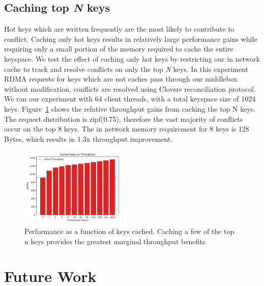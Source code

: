 \subsection{Caching top \textit{N} keys} 
Hot keys which are written frequently are the most likely to
contribute to conflict. Caching only hot keys results in relatively
large performance gains while requiring only a small portion of the
memory required to cache the entire keyspace. We test the effect of
caching only hot keys by restricting our in network cache to track and
resolve conflicts on only the top \textit{N} keys. In this experiment
RDMA requests for keys which are not caches pass through our middlebox
without modification, conflicts are resolved using Clovers
reconciliation protocol. We ran our experiment with 64 client threads,
with a total keyspace size of 1024 keys. Figure~\ref{fig:cache} shows
the relative throughput gains from caching the top N keys. The request
distribution is zipf(0.75), therefore the vast majority of conflicts
occur on the top 8 keys. The in network memory requirement for 8 keys
is 128 Bytes, which results in 1.3x throughput improvement.

\begin{figure}
    \includegraphics[width=0.45\textwidth]{fig/cache.pdf}
    \caption{Performance as a function of keys cached. Caching a few
    of the top n keys provides the greatest marginal throughput
    benefits.}
    \label{fig:cache}
\end{figure}

\section{Future Work}

